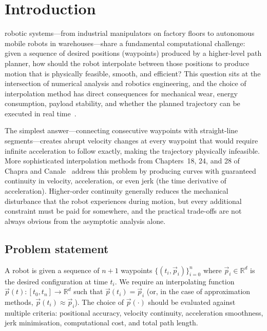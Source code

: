 \section{Introduction}
\label{sec:introduction}

 robotic systems---from industrial
manipulators on factory floors to autonomous mobile robots in
warehouses---share a fundamental computational challenge: given a
sequence of desired positions (waypoints) produced by a higher-level
path planner, how should the robot interpolate between those
positions to produce motion that is physically feasible, smooth, and
efficient? This question sits at the intersection of numerical
analysis and robotics engineering, and the choice of interpolation
method has direct consequences for mechanical wear, energy
consumption, payload stability, and whether the planned trajectory
can be executed in real time~\cite{biagiotti2008}.

The simplest answer---connecting consecutive waypoints with
straight-line segments---creates abrupt velocity changes at every
waypoint that would require infinite acceleration to follow exactly,
making the trajectory physically infeasible. More sophisticated
interpolation methods from Chapters~18, 24, and 28 of Chapra and
Canale~\cite{chapra2021} address this problem by producing curves
with guaranteed continuity in velocity, acceleration, or even jerk
(the time derivative of acceleration). Higher-order continuity
generally reduces the mechanical disturbance that the robot
experiences during motion, but every additional constraint must be
paid for somewhere, and the practical trade-offs are not always
obvious from the asymptotic analysis alone.

\subsection{Problem statement}
\label{sec:problem-statement}

A robot is given a sequence of $n+1$ waypoints
$\{(t_i, \vec{p}_i)\}_{i=0}^{n}$ where $\vec{p}_i \in \mathbb{R}^d$ is
the desired configuration at time $t_i$. We require an interpolating
function $\vec{p}(t) : [t_0, t_n] \to \mathbb{R}^d$ such that
$\vec{p}(t_i) = \vec{p}_i$ (or, in the case of approximation methods,
$\vec{p}(t_i) \approx \vec{p}_i$). The choice of $\vec{p}(\cdot)$
should be evaluated against multiple criteria: positional accuracy,
velocity continuity, acceleration smoothness, jerk minimisation,
computational cost, and total path length.

